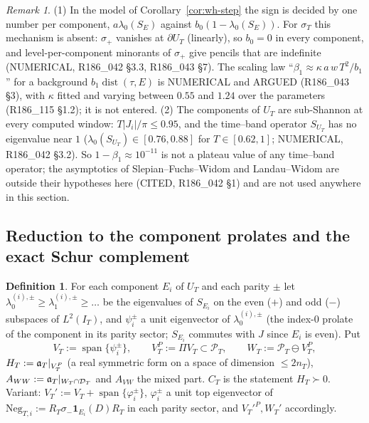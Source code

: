 \documentclass[11pt]{amsart}
\theoremstyle{definition}
\newtheorem{definition}[theorem]{Definition}
\theoremstyle{remark}
\newtheorem{remark}[theorem]{Remark}
\newcommand{\PT}{\mathcal P_T}
\newcommand{\IT}{I_T}
\newcommand{\sT}{\sigma_T}
\begin{document}
\begin{remark}\label{rem:wh-model}
(1) In the model of Corollary~\ref{cor:wh-step} the sign is decided by one number per component,
$a\lambda_0(S_E)$ against $b_0(1-\lambda_0(S_E))$. For $\sT$ this mechanism is absent: $\sigma_+$ vanishes at
$\partial U_T$ (linearly), so $b_0=0$ in every component, and level-per-component minorants of $\sigma_+$ give
pencils that are indefinite (NUMERICAL, R186\_042 \S3.3, R186\_043 \S7). The scaling law
``$\beta_1\approx\kappa\,a\,w\,T^2/b_1$'' for a background $b_1\operatorname{dist}(\tau,E)$ is NUMERICAL and ARGUED
(R186\_043 \S3), with $\kappa$ fitted and varying between $0.55$ and $1.24$ over the parameters
(R186\_115 \S1.2); it is not entered.
(2) The components of $U_T$ are sub-Shannon at every computed window: $T|J_i|/\pi\le0.95$, and the time--band
operator $S_{U_T}$ has no eigenvalue near $1$ ($\lambda_0(S_{U_T})\in[0.76,0.88]$ for $T\in[0.62,1]$; NUMERICAL,
R186\_042 \S3.2). So $1-\beta_1\approx10^{-11}$ is not a plateau value of any time--band operator; the
asymptotics of Slepian--Fuchs--Widom and Landau--Widom are outside their hypotheses here (CITED, R186\_042 \S1)
and are not used anywhere in this section.
\end{remark}

\subsection{Reduction to the component prolates and the exact Schur complement}\label{subsec:wh-prolate}

\begin{definition}\label{def:wh-V}
For each component $E_i$ of $U_T$ and each parity $\pm$ let $\lambda_0^{(i),\pm}\ge\lambda_1^{(i),\pm}\ge\dots$ be the
eigenvalues of $S_{E_i}$ on the even ($+$) and odd ($-$) subspaces of $L^2(\IT)$, and $\psi_i^\pm$ a unit eigenvector
of $\lambda_0^{(i),\pm}$ (the index-$0$ prolate of the component in its parity sector; $S_{E_i}$ commutes with $J$
since $E_i$ is even). Put
\[
V_T:=\operatorname{span}\{\psi_i^\pm\},\qquad V_T^P:=\Pi V_T\subset\PT,\qquad W_T:=\PT\ominus V_T^P,
\]
$H_T:=\mathfrak a_T|_{V_T^P}$ (a real symmetric form on a space of dimension $\le2n_T$), $A_{WW}:=\mathfrak a_T|_{W_T\cap\mathcal D_T}$ and
$A_{VW}$ the mixed part. $C_T$ is the statement $H_T\succ0$. Variant: $V_T':=V_T+\operatorname{span}\{\varphi_i^\pm\}$,
$\varphi_i^\pm$ a unit top eigenvector of $\mathrm{Neg}_{T,i}:=R_T\sigma_-\mathbf 1_{E_i}(D)R_T$ in each parity sector, and
$V_T'^P,W_T'$ accordingly.
\end{definition}
\end{document}
